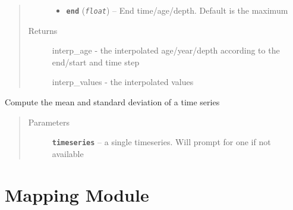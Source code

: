 \documentclass[letterpaper,10pt,english]{sphinxmanual}
\begin{document}
\begin{fulllineitems}
\begin{fulllineitems}
\begin{quote}
\begin{description}
\begin{itemize}
\item {} 
\textbf{\texttt{end}} (\emph{\texttt{float}}) -- End time/age/depth. Default is the maximum

\end{itemize}

\item[{Returns}] \leavevmode

interp\_age - the interpolated age/year/depth according to
the end/start and time step

interp\_values - the interpolated values


\end{description}\end{quote}

\end{fulllineitems}


\begin{fulllineitems}
\label{Basic:pyleoclim.Basic.simpleStats}
Compute the mean and standard deviation of a time series
\begin{quote}\begin{description}
\item[{Parameters}] \leavevmode
\textbf{\texttt{timeseries}} -- a single timeseries. Will prompt for one
if not available

\end{description}\end{quote}

\end{fulllineitems}


\end{fulllineitems}



\chapter{Mapping Module}
\label{Mapping::doc}\label{Mapping:mapping-module}
\end{document}
